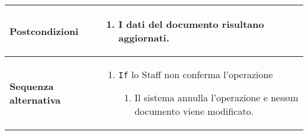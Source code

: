 \documentclass[a4paper]{report}
\begin{document}
\begin{table}[H]
\begin{tabular}{|p{3.9cm}|p{9.9cm}|}
	\textbf{Postcondizioni} & 
    \begin{enumerate}[leftmargin=14pt,label=\arabic*.,labelsep=0.5em,topsep=0pt,partopsep=0pt,parsep=0pt,itemsep=0pt]
        \item I dati del documento risultano aggiornati. \end{enumerate} \\ \hline
	\textbf{Sequenza alternativa} & 
\begin{enumerate}[leftmargin=14pt,label=\arabic*.,labelsep=0.5em,topsep=0pt,partopsep=0pt,parsep=0pt,itemsep=0pt]
    \item \texttt{If} lo Staff non conferma l’operazione
    \begin{enumerate}[label=\arabic{enumi}.\arabic*.,leftmargin=22pt,labelsep=0.5em,topsep=0pt,partopsep=0pt,parsep=0pt,itemsep=0pt]
        \item Il sistema annulla l’operazione e nessun documento viene modificato.
    \end{enumerate}
\end{enumerate} \\ \hline
\end{tabular}
\end{table}
\end{document}
